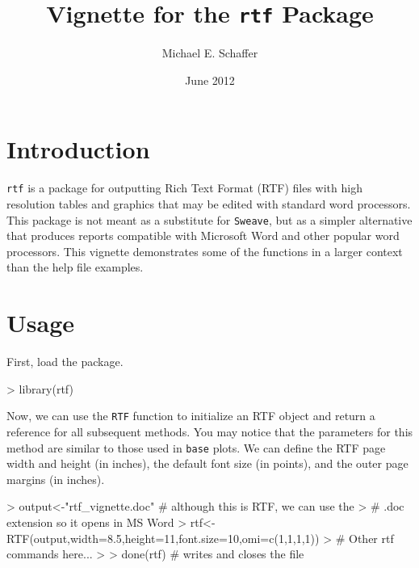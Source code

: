 \documentclass[11pt,letterpaper]{article}
\begin{document}


\title{Vignette for the \texttt{rtf} Package}
\author{Michael E. Schaffer}
\date{June 2012}
\maketitle

\tableofcontents

\section{Introduction}

\texttt{rtf} is a package for outputting Rich Text Format (RTF) files with high resolution tables and graphics that may be edited with standard word processors.  This package is not meant as a substitute for \texttt{Sweave}, but as a simpler alternative that produces reports compatible with Microsoft Word and other popular word processors.  This vignette demonstrates some of the functions in a larger context than the help file examples.


\section{Usage}

First, load the package.

\begin{Schunk}
\begin{Sinput}
> library(rtf)
\end{Sinput}
\end{Schunk}


Now, we can use the \texttt{RTF} function to initialize an RTF object and return a reference for all subsequent methods.  You may notice that the parameters for this method are similar to those used in \texttt{base} plots.  We can define the RTF page width and height (in inches), the default font size (in points), and the outer page margins (in inches).

\begin{Schunk}
\begin{Sinput}
> output<-"rtf_vignette.doc"   # although this is RTF, we can use the
>                              # .doc extension so it opens in MS Word
> rtf<-RTF(output,width=8.5,height=11,font.size=10,omi=c(1,1,1,1))
> # Other rtf commands here...
> 
> done(rtf)                    # writes and closes the file
\end{Sinput}
\end{Schunk}
\end{document}

